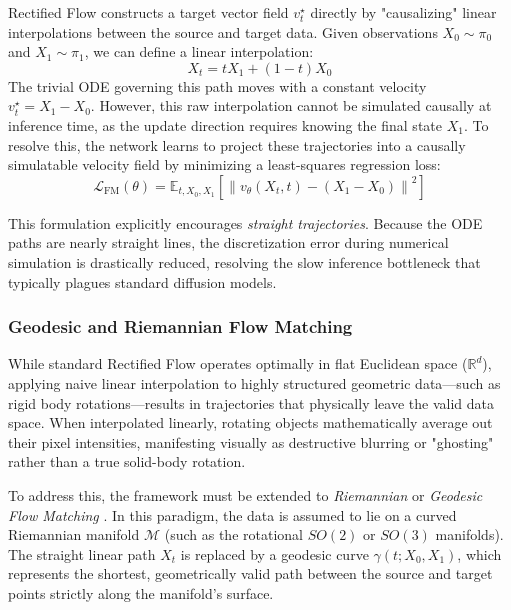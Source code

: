 \documentclass{l4proj}
\begin{document}
Rectified Flow constructs a target vector field $v^\star_t$ directly by "causalizing" linear interpolations between the source and target data. Given observations $X_0 \sim \pi_0$ and $X_1 \sim \pi_1$, we can define a linear interpolation:
\begin{equation}
    X_t = t X_1 + (1-t) X_0
\end{equation}
The trivial ODE governing this path moves with a constant velocity $v^\star_t = X_1 - X_0$. However, this raw interpolation cannot be simulated causally at inference time, as the update direction requires knowing the final state $X_1$. To resolve this, the network learns to project these trajectories into a causally simulatable velocity field by minimizing a least-squares regression loss:
\begin{equation}
    \mathcal{L}_{\text{FM}}(\theta) = \mathbb{E}_{t, X_0, X_1}\left[ \left\lVert v_\theta(X_t, t) - (X_1 - X_0) \right\rVert^2 \right]
\end{equation}

This formulation explicitly encourages \textit{straight trajectories}. Because the ODE paths are nearly straight lines, the discretization error during numerical simulation is drastically reduced, resolving the slow inference bottleneck that typically plagues standard diffusion models.

\subsubsection{Geodesic and Riemannian Flow Matching}
While standard Rectified Flow operates optimally in flat Euclidean space ($\mathbb{R}^d$), applying naive linear interpolation to highly structured geometric data—such as rigid body rotations—results in trajectories that physically leave the valid data space. When interpolated linearly, rotating objects mathematically average out their pixel intensities, manifesting visually as destructive blurring or "ghosting" rather than a true solid-body rotation.

To address this, the framework must be extended to \textit{Riemannian} or \textit{Geodesic Flow Matching} \citep{chen2024riemannian}. In this paradigm, the data is assumed to lie on a curved Riemannian manifold $\mathcal{M}$ (such as the rotational $SO(2)$ or $SO(3)$ manifolds). The straight linear path $X_t$ is replaced by a geodesic curve $\gamma(t; X_0, X_1)$, which represents the shortest, geometrically valid path between the source and target points strictly along the manifold's surface.
\end{document}
